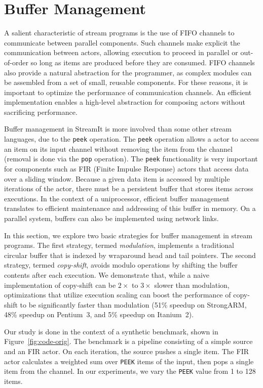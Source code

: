 \section{Buffer Management}
\label{sec:buffer}

A salient characteristic of stream programs is the use of FIFO
channels to communicate between parallel components.  Such channels
make explicit the communication between actors, allowing execution to
proceed in parallel or out-of-order so long as items are produced
before they are consumed.  FIFO channels also provide a natural
abstraction for the programmer, as complex modules can be assembled
from a set of small, reusable components.  For these reasons, it is
important to optimize the performance of communication channels.  An
efficient implementation enables a high-level abstraction for
composing actors without sacrificing performance.

Buffer management in StreamIt is more involved than some other stream
languages, due to the {\tt peek} operation.  The {\tt peek} operation
allows a actor to access an item on its input channel without
removing the item from the channel (removal is done via the {\tt pop}
operation).  The {\tt peek} functionality is very important for
components such as FIR (Finite Impulse Response) actors that access
data over a sliding window.  Because a given data item is accessed by
multiple iterations of the actor, there must be a persistent buffer
that stores items across executions.  In the context of a
uniprocessor, efficient buffer management translates to efficient
maintenance and addressing of this buffer in memory.  On a parallel
system, buffers can also be implemented using network links.

In this section, we explore two basic strategies for buffer management
in stream programs.  The first strategy, termed {\it modulation},
implements a traditional circular buffer that is indexed by wraparound
head and tail pointers.  The second strategy, termed {\it copy-shift},
avoids modulo operations by shifting the buffer contents after each
execution.  We demonstrate that, while a naive implementation of
copy-shift can be $2\times$ to $3\times$ slower than modulation, optimizations that
utilize execution scaling can boost the performance of copy-shift to
be significantly faster than modulation (51\% speedup on StrongARM,
48\% speedup on Pentium~3, and 5\% speedup on Itanium~2).



Our study is done in the context of a synthetic benchmark, shown in
Figure~\ref{fig:code-orig}.  
The benchmark is a pipeline consisting of a simple source and an FIR
actor.  On each iteration, the source pushes a single item.  The FIR
actor calculates a weighted sum over {\tt PEEK} items of the input,
then pops a single item from the channel.  In our experiments, we vary
the {\tt PEEK} value from 1 to 128 items.

